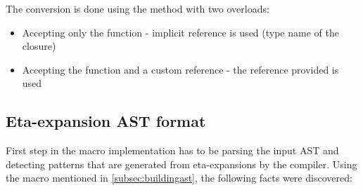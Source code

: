 The conversion is done using the  method with two overloads:
\begin{itemize}
	\item Accepting only the function - implicit reference is used (type name of the closure)
	\item Accepting the function and a custom reference - the reference provided is used
\end{itemize}

\subsection{Eta-expansion AST format}

First step in the macro implementation has to be parsing the input AST and detecting patterns that are generated from eta-expansions by the compiler. Using the  macro mentioned in \ref{subsec:buildingast}, the following facts were discovered:

